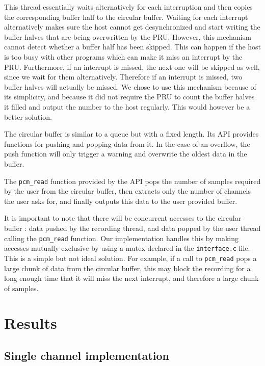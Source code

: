 \documentclass[]{report}
\begin{document}
This thread essentially waits alternatively for each interruption and then copies the corresponding buffer half to the circular buffer. Waiting for each interrupt alternatively makes sure the host cannot get desynchronized and start writing the buffer halves that are being overwritten by the PRU. However, this mechanism cannot detect whether a buffer half has been skipped. This can happen if the host is too busy with other programs which can make it miss an interrupt by the PRU. Furthermore, if an interrupt is missed, the next one will be skipped as well, since we wait for them alternatively. Therefore if an interrupt is missed, two buffer halves will actually be missed. We chose to use this mechanism because of its simplicity, and because it did not require the PRU to count the buffer halves it filled and output the number to the host regularly. This would however be a better solution.

The circular buffer is similar to a queue but with a fixed length. Its API provides functions for pushing and popping data from it. In the case of an overflow, the push function will only trigger a warning and overwrite the oldest data in the buffer.

The \texttt{pcm\_read} function provided by the API pops the number of samples required by the user from the circular buffer, then extracts only the number of channels the user asks for, and finally outputs this data to the user provided buffer.

It is important to note that there will be concurrent accesses to the circular buffer : data pushed by the recording thread, and data popped by the user thread calling the \texttt{pcm\_read} function. Our implementation handles this by making accesses mutually exclusive by using a mutex declared in the \texttt{interface.c} file. This is a simple but not ideal solution. For example, if a call to \texttt{pcm\_read} pops a large chunk of data from the circular buffer, this may block the recording for a long enough time that it will miss the next interrupt, and therefore a large chunk of samples.

\hypertarget{results}{%
\chapter{Results}\label{results}}

\hypertarget{single-channel-implementation}{%
\section{Single channel
implementation}\label{single-channel-implementation}}
\end{document}
